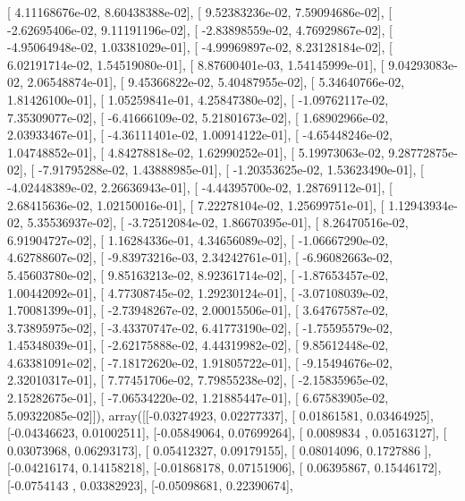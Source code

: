\documentclass{article}
\begin{document}
       [  4.11168676e-02,   8.60438388e-02],
       [  9.52383236e-02,   7.59094686e-02],
       [ -2.62695406e-02,   9.11191196e-02],
       [ -2.83898559e-02,   4.76929867e-02],
       [ -4.95064948e-02,   1.03381029e-01],
       [ -4.99969897e-02,   8.23128184e-02],
       [  6.02191714e-02,   1.54519080e-01],
       [  8.87600401e-03,   1.54145999e-01],
       [  9.04293083e-02,   2.06548874e-01],
       [  9.45366822e-02,   5.40487955e-02],
       [  5.34640766e-02,   1.81426100e-01],
       [  1.05259841e-01,   4.25847380e-02],
       [ -1.09762117e-02,   7.35309077e-02],
       [ -6.41666109e-02,   5.21801673e-02],
       [  1.68902966e-02,   2.03933467e-01],
       [ -4.36111401e-02,   1.00914122e-01],
       [ -4.65448246e-02,   1.04748852e-01],
       [  4.84278818e-02,   1.62990252e-01],
       [  5.19973063e-02,   9.28772875e-02],
       [ -7.91795288e-02,   1.43888985e-01],
       [ -1.20353625e-02,   1.53623490e-01],
       [ -4.02448389e-02,   2.26636943e-01],
       [ -4.44395700e-02,   1.28769112e-01],
       [  2.68415636e-02,   1.02150016e-01],
       [  7.22278104e-02,   1.25699751e-01],
       [  1.12943934e-02,   5.35536937e-02],
       [ -3.72512084e-02,   1.86670395e-01],
       [  8.26470516e-02,   6.91904727e-02],
       [  1.16284336e-01,   4.34656089e-02],
       [ -1.06667290e-02,   4.62788607e-02],
       [ -9.83973216e-03,   2.34242761e-01],
       [ -6.96082663e-02,   5.45603780e-02],
       [  9.85163213e-02,   8.92361714e-02],
       [ -1.87653457e-02,   1.00442092e-01],
       [  4.77308745e-02,   1.29230124e-01],
       [ -3.07108039e-02,   1.70081399e-01],
       [ -2.73948267e-02,   2.00015506e-01],
       [  3.64767587e-02,   3.73895975e-02],
       [ -3.43370747e-02,   6.41773190e-02],
       [ -1.75595579e-02,   1.45348039e-01],
       [ -2.62175888e-02,   4.44319982e-02],
       [  9.85612448e-02,   4.63381091e-02],
       [ -7.18172620e-02,   1.91805722e-01],
       [ -9.15494676e-02,   2.32010317e-01],
       [  7.77451706e-02,   7.79855238e-02],
       [ -2.15835965e-02,   2.15282675e-01],
       [ -7.06534220e-02,   1.21885447e-01],
       [  6.67583905e-02,   5.09322085e-02]]), array([[-0.03274923,  0.02277337],
       [ 0.01861581,  0.03464925],
       [-0.04346623,  0.01002511],
       [-0.05849064,  0.07699264],
       [ 0.0089834 ,  0.05163127],
       [ 0.03073968,  0.06293173],
       [ 0.05412327,  0.09179155],
       [ 0.08014096,  0.1727886 ],
       [-0.04216174,  0.14158218],
       [-0.01868178,  0.07151906],
       [ 0.06395867,  0.15446172],
       [-0.0754143 ,  0.03382923],
       [-0.05098681,  0.22390674],
\end{document}
